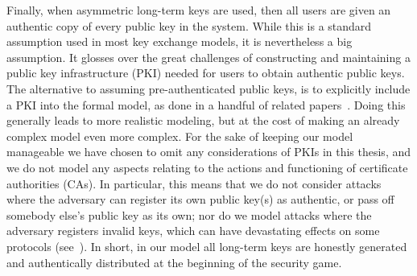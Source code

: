 Finally,
when asymmetric long-term keys are used,
then all users are given an authentic copy of every public key in the system.
While this is a standard assumption used in most key exchange models,
it is nevertheless a big assumption. 
It glosses over the great challenges of constructing and maintaining a public key infrastructure (PKI) needed for users to obtain authentic public keys.
The alternative to assuming pre-authenticated public keys,
is to explicitly include a PKI into the formal model,
as done in a handful of related papers~\cite{PKC:BFPW07,AFRICACRYPT:FarWar09,ESORICS:BCFPPS13}.
Doing this generally leads to more realistic modeling,
but at the cost of making an already complex model even more complex.
For the sake of keeping our model manageable we have chosen to omit any considerations of PKIs in this thesis,
and we do not model any aspects relating to the actions and functioning of certificate authorities (CAs).
In particular,
this means that we do not consider attacks where the adversary can register its own public key(s) as authentic,
or pass off somebody else's public key as its own;
nor do we model attacks where the adversary registers invalid keys,
which can have devastating effects on some protocols (see~\cite{INDOCRYPT:MenUst06}).
In short,
in our model all long-term keys are honestly generated and authentically distributed at the beginning of the security game. 



